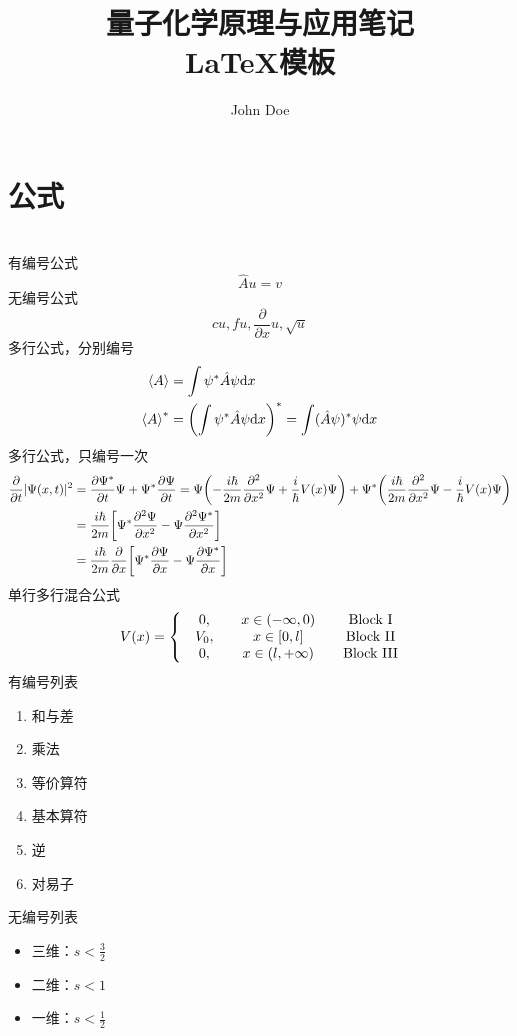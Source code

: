 \documentclass[11pt,a4paper,onecolumn]{article}
\title{%
	\heiti \huge \vspace{-50pt} 量子化学原理与应用笔记 \\ \LaTeX 模板}
\author{John Doe}
\begin{document}


\maketitle
\vspace{-10pt}



\section{公式}

~\\
有编号公式
\begin{equation}
  \hat A u = v
\end{equation}
无编号公式
\begin{equation*}
  c u, f u, \frac{\partial}{\partial x} u, \sqrt{u}
\end{equation*}
多行公式，分别编号
\begin{align}
\ev{A} &= \int \psi^* \hat A \psi \dd x \\
\ev{A}^* &= \qty(\int \psi^* \hat A \psi \dd x )^* = \int (\hat A \psi)^* \psi \dd x
\end{align}
多行公式，只编号一次
\begin{align}
\pdv{t} |\Psi(x,t)|^2  &= \pdv{\Psi^*}{t}\Psi + \Psi^*\pdv{\Psi}{t}  
= \Psi \qty(-\dfrac{i\hbar}{2m} \pdv[2]{x} \Psi + \dfrac{i}{\hbar} V(x) \Psi) + \Psi^* \qty(\dfrac{i\hbar}{2m} \pdv[2]{x} \Psi - \dfrac{i}{\hbar} V(x) \Psi) \notag\\
&= \dfrac{i\hbar}{2m} \qty[\Psi^*\pdv[2]{\Psi}{x} - \Psi\pdv[2]{\Psi^*}{x}] \notag\\
&= \dfrac{i\hbar}{2m} \pdv{x} \qty[\Psi^*\pdv{\Psi}{x} - \Psi\pdv{\Psi^*}{x}]
\end{align}
单行多行混合公式
\begin{equation}\label{eq.finite-square-potential}
V(x) = \left\{
\mqty{
& 0, && x \in (-\infty, 0) && \text{Block I} \\
& V_0, && x \in [0, l] && \text{Block II} \\
& 0, && x \in (l, +\infty) && \text{Block III}
}
\right.
\end{equation}
有编号列表
\begin{enumerate}[nosep]
	\item 和与差
	\item 乘法
	\item 等价算符
	\item 基本算符
	\item 逆
	\item 对易子
\end{enumerate}
无编号列表
	\begin{itemize}[nosep]
	\item 三维：$ s < \frac{3}{2} $
	\item  二维：$ s < 1 $
	\item  一维：$ s < \frac{1}{2} $
\end{itemize}
\end{document}

